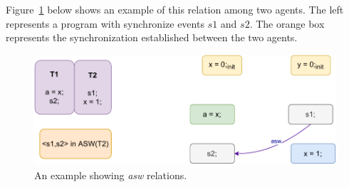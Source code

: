             Figure~\ref{model:agent-sync-with} below shows an example of this relation among two agents. 
            The left represents a program with synchronize events $s1$ and $s2$. 
            The orange box represents the synchronization established between the two agents.
            \begin{figure}[H]
                \centering
                \includegraphics[scale=0.7]{3.ECMAScriptMemoryModel/AgentSyncWith.pdf}
                \caption{An example showing \textit{asw} relations.}
                \label{model:agent-sync-with}
            \end{figure}
        
